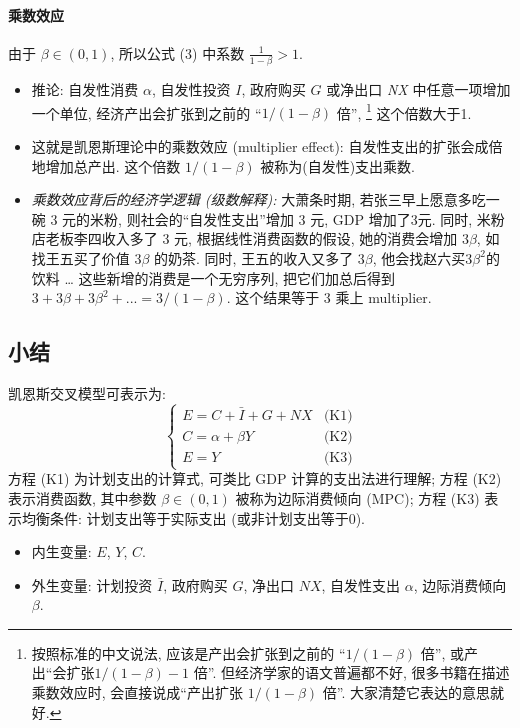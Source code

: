 \documentclass[11pt]{ctexart}
\begin{document}
\paragraph{乘数效应}   由于 $\beta \in  (0, 1)$,  所以公式  (3) 中系数 $\frac{1}{1-\beta} > 1$.
\begin{itemize}
  \item
    推论: 自发性消费 $\alpha$,  自发性投资 $I$,  政府购买 $G$ 或净出口 \textit{NX}
    中任意一项增加一个单位, 经济产出会扩张到之前的 ``$1/ (1-\beta)$ 倍'',%
        \footnote{按照标准的中文说法, 应该是产出会扩张到之前的 ``$1/ (1-\beta)$ 倍'', 
             或产出``会扩张$1/ (1-\beta) - 1$ 倍''. 
             但经济学家的语文普遍都不好, 很多书籍在描述乘数效应时,
             会直接说成``产出扩张 $1/ (1-\beta)$ 倍''. 大家清楚它表达的意思就好.} 
    这个倍数大于1. 
  \item
    这就是凯恩斯理论中的乘数效应  (multiplier effect):
    自发性支出的扩张会成倍地增加总产出. 这个倍数 $1/ (1-\beta)$
    被称为(自发性)支出乘数.

  \item
    \textit{乘数效应背后的经济学逻辑 (级数解释):} 大萧条时期, 若张三早上愿意多吃一碗 3
    元的米粉, 则社会的``自发性支出''增加 3 元, GDP
    增加了3元. 同时, 米粉店老板李四收入多了 3
    元, 根据线性消费函数的假设, 她的消费会增加 $3\beta$, 
    如找王五买了价值 $3 \beta$ 的奶茶. 同时, 王五的收入又多了
    $3 \beta$, 他会找赵六买$3 \beta^2$的饮料 \dots
    这些新增的消费是一个无穷序列, 把它们加总后得到 $3 + 3 \beta + 3 \beta^2 + ... = 3/ (1-\beta)$.
    这个结果等于 3 乘上 multiplier.
  \end{itemize}

\subsection*{小结} 

凯恩斯交叉模型可表示为:
\begin{equation*}
\, \begin{cases}
E = C + \bar{I} + G + NX  &\text{(K1)} \\
C = \alpha + \beta Y &\text{(K2)}  \\
E =Y  &\text{(K3)}
\end{cases}  
\end{equation*}
方程 (K1) 为计划支出的计算式, 可类比 GDP 计算的支出法进行理解;
方程 (K2) 表示消费函数, 其中参数 $\beta \in (0,1)$ 被称为边际消费倾向 (MPC);
方程 (K3) 表示均衡条件: 计划支出等于实际支出 (或非计划支出等于0).

\begin{itemize}
\item 
  内生变量: $E$, $Y$, $C$.
\item 
  外生变量: 计划投资 $\bar{I}$, 政府购买 $G$, 净出口 $NX$, 自发性支出 $\alpha$, 边际消费倾向 $\beta$.  
\end{itemize}
\end{document}
